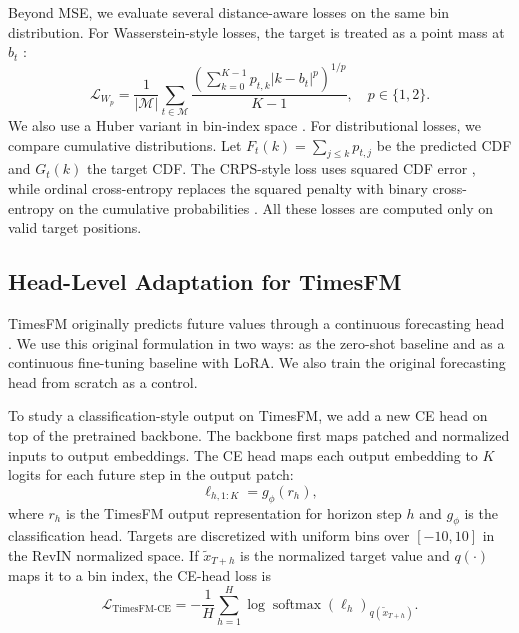 \documentclass{article}
\begin{document}
Beyond MSE, we evaluate several distance-aware losses on the same bin
distribution.  For Wasserstein-style losses, the target is treated as a point
mass at $b_t$ \citep{villani2008optimal,chernov2024wasserstein}:
\begin{equation}
    \mathcal{L}_{W_p}
    = \frac{1}{|\mathcal{M}|}\sum_{t\in\mathcal{M}}
      \frac{\left(\sum_{k=0}^{K-1}p_{t,k}|k-b_t|^p\right)^{1/p}}{K-1},
    \quad p\in\{1,2\}.
\end{equation}
We also use a Huber variant in bin-index space \citep{huber1964robust}.  For
distributional losses, we compare cumulative distributions.  Let
$F_t(k)=\sum_{j\leq k}p_{t,j}$ be the predicted CDF and $G_t(k)$ the target CDF.
The CRPS-style loss uses squared CDF error \citep{matheson1976scoring}, while
ordinal cross-entropy replaces the squared penalty with binary cross-entropy on
the cumulative probabilities \citep{wang2025ordinalce}.  All these losses are
computed only on valid target positions.

\subsection{Head-Level Adaptation for TimesFM}

TimesFM originally predicts future values through a continuous forecasting head
\citep{das2024timesfm}.  We use this original formulation in two ways: as the
zero-shot baseline and as a continuous fine-tuning baseline with LoRA.  We also
train the original forecasting head from scratch as a control.

To study a classification-style output on TimesFM, we add a new CE head on top
of the pretrained backbone.  The backbone first maps patched and normalized
inputs to output embeddings.  The CE head maps each output embedding to
$K$ logits for each future step in the output patch:
\begin{equation}
    \ell_{h,1:K}=g_\phi(r_h),
\end{equation}
where $r_h$ is the TimesFM output representation for horizon step $h$ and
$g_\phi$ is the classification head.  Targets are discretized with uniform bins
over $[-10,10]$ in the RevIN normalized space.  If $\tilde{x}_{T+h}$ is the
normalized target value and
$q(\cdot)$ maps it to a bin index, the CE-head loss is
\begin{equation}
    \mathcal{L}_{\mathrm{TimesFM\text{-}CE}}
    = -\frac{1}{H}\sum_{h=1}^{H}
      \log \operatorname{softmax}(\ell_h)_{q(\tilde{x}_{T+h})}.
\end{equation}
\end{document}

